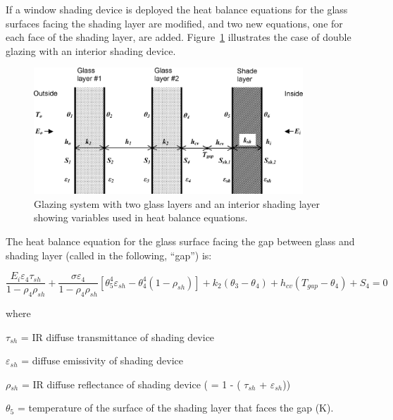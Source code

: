 If a window shading device is deployed the heat balance equations for the glass surfaces facing the shading layer are modified, and two new equations, one for each face of the shading layer, are added. Figure~\ref{fig:glazing-system-with-two-glass-layers-and-an} illustrates the case of double glazing with an interior shading device.

\begin{figure}[hbtp] %
\centering
\includegraphics[width=0.9\textwidth, height=0.9\textheight, keepaspectratio=true]{media/image1663.png}
\caption{Glazing system with two glass layers and an interior shading layer showing variables used in heat balance equations. \protect \label{fig:glazing-system-with-two-glass-layers-and-an}}
\end{figure}

The heat balance equation for the glass surface facing the gap between glass and shading layer (called in the following, ``gap'') is:

\begin{equation}
\frac{{{E_i}{\varepsilon_4}{\tau_{sh}}}}{{1 - {\rho_4}{\rho_{sh}}}} + \frac{{\sigma {\varepsilon_4}}}{{1 - {\rho_4}{\rho_{sh}}}}\left[ {\theta_5^4{\varepsilon_{sh}} - \theta_4^4(1 - {\rho_{sh}})} \right] + {k_2}\left( {{\theta_3} - {\theta_4}} \right) + {h_{cv}}\left( {{T_{gap}} - {\theta_4}} \right) + {S_4} = 0
\end{equation}

where

\emph{$\tau$\(_{sh}\)} = IR diffuse transmittance of shading device

\emph{$\varepsilon$\(_{sh}\)} = diffuse emissivity of shading device

\emph{$\rho$\(_{sh}\)} = IR diffuse reflectance of shading device ( = 1 - ( \emph{$\tau$\(_{sh}\)} + \emph{$\varepsilon$\(_{sh}\)}))

\emph{$\theta$\(_{5}\)} = temperature of the surface of the shading layer that faces the gap (K).

